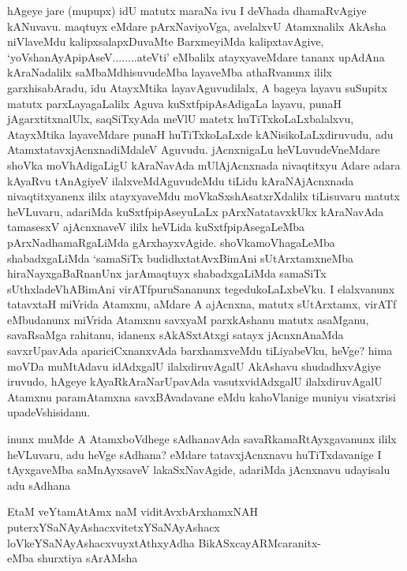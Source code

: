 \begin{artha}
hAgeye jare (mupupx) idU matutx maraNa ivu I deVhada dhamaRvAgiye kANuvavu. maqtuyx eMdare pArxNaviyoVga, avelalxvU Atamxnalilx AkAsha niVlaveMdu kalipxsalapxDuvaMte BarxmeyiMda kalipxtavAgive, `yoV\s shanAyApipAseV........ateVti' eMbalilx atayxyaveMdare tananx upAdAna kAraNadalilx saMbaMdhisuvudeMba layaveMba athaRvanunx ililx garxhisabAradu, idu AtayxMtika layavAguvudilalx, A bageya layavu suSupitx matutx parxLayagaLalilx Aguva kuSxtfpipAsAdigaLa layavu, punaH jAgarxtitxnalUlx, saqSiTxyAda meVlU matetx huTiTxkoLaLxbalalxvu, AtayxMtika layaveMdare punaH huTiTxkoLaLxde kANisikoLaLxdiruvudu, adu AtamxtatavxjAcnxnadiMdaleV Aguvudu. jAcnxnigaLu heVLuvudeVneMdare shoVka moVhAdigaLigU kAraNavAda mUlAjAcnxnada nivaqtitxyu Adare adara kAyaRvu tAnAgiyeV ilalxveMdAguvudeMdu tiLidu kAraNAjAcnxnada nivaqtitxyanenx ililx atayxyaveMdu moVkaSxshAsatxrXdalilx tiLisuvaru matutx heVLuvaru, adariMda kuSxtfpipAseyuLaLx pArxNatatavxkUkx kAraNavAda tamasesxV ajAcnxnaveV ililx heVLida kuSxtfpipAsegaLeMba pArxNadhamaRgaLiMda gArxhayxvAgide. shoVkamoVhagaLeMba shabadxgaLiMda `samaSiTx budidhxtatAvxBimAni sUtArxtamxneMba hiraNayxgaBaRnanUnx jarAmaqtuyx shabadxgaLiMda samaSiTx sUthxladeVhABimAni virATfpuruSananunx tegedukoLaLxbeVku. I elalxvanunx tatavxtaH miVrida Atamxnu, aMdare A ajAcnxna, matutx sUtArxtamx, virATf eMbudanunx miVrida Atamxnu savxyaM parxkAshanu matutx asaMganu, savaRsaMga rahitanu, idanenx sAkASxtAtxgi satayx jAcnxnAnaMda savxrUpavAda apariciCxnanxvAda barxhamxveMdu tiLiyabeVku, heVge? hima moVDa muMtAdavu idAdxgalU ilalxdiruvAgalU AkAshavu shudadhxvAgiye iruvudo, hAgeye kAyaRkAraNarUpavAda vasutxvidAdxgalU ilalxdiruvAgalU Atamxnu paramAtamxna savxBAvadavane eMdu kahoVlanige muniyu visatxrisi upadeVshisidanu.
\end{artha}


\begin{artha}
inunx muMde A AtamxboVdhege sAdhanavAda savaRkamaRtAyxgavanunx ililx heVLuvaru, adu heVge sAdhana? eMdare \mdash  tatavxjAcnxnavu huTiTxdavanige I tAyxgaveMba saMnAyxsaveV lakaSxNavAgide, adariMda jAcnxnavu udayisalu adu sAdhana \mdash 

EtaM veYtamAtAmx naM viditAvxbArxhamxNAH puterxYSaNAyAshacxvitetxYSaNAyAshacx loVkeYSaNAyAshacxvuyxtAthxyAdha BikASxcayARMcaranitx-\\
eMba shurxtiya sArAMsha \mdash 
\end{artha}

